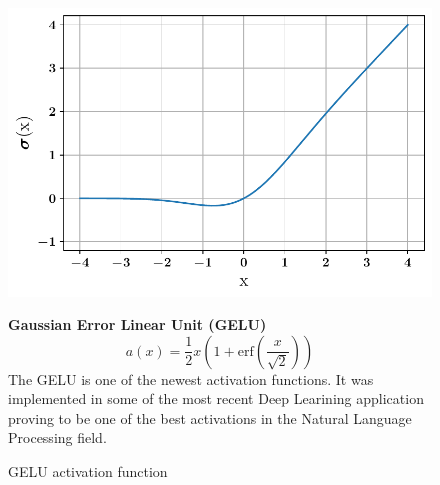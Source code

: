 \begin{figure}[!h]
\begin{minipage}{0.45\textwidth}
    \centering
\includegraphics[width=\textwidth]{images/networks/act_gelu.pdf}
\caption{GELU activation function}
    \label{fig:gelu}
\end{minipage}
\hfill
\begin{minipage}{0.5\textwidth}
    \textbf{Gaussian Error Linear Unit (GELU)}
   \begin{equation}
       a(x) = \frac{1}{2} x \left( 1+\text{erf} \left( \frac{x}{\sqrt{2}}\right)\right)
   \end{equation}
   The GELU\cite{gelu} is one of the newest activation functions. It was implemented in some of the most recent Deep Learining application proving to be one of the best activations in the Natural Language Processing field\cite{bert,gpt}. 
\end{minipage}
\end{figure}

